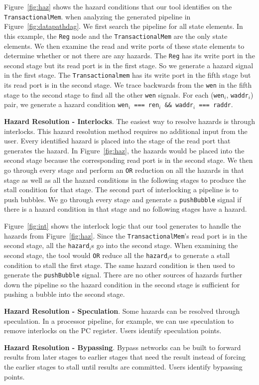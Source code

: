 Figure~\ref{fig:haz} shows the hazard conditions that our tool
identifies on the {\tt TransactionalMem}. when analyzing the generated pipeline in
Figure~\ref{fig:datapathdag}. We first search the pipeline for all
state elements. In this example, the {\tt Reg} node and the 
{\tt TransactionalMem} are the only state elements. We then examine
the read and write ports of these state elements to determine whether
or not there are any hazards. The {\tt Reg} has its write port in the
second stage but its read port is in the first stage. So we generate a
hazard signal in the first stage. The {\tt Transactionalmem} has its
write port in the fifth stage but its read port is in the second
stage. We trace backwards from the {\tt wen} in the fifth stage to the
second stage to find all the other {\tt wen} signals. For each 
({\tt wen}$_i$, {\tt waddr}$_i$) pair, we generate a hazard condition
{\tt wen$_i$ === ren$_i$ \&\& waddr$_i$ === raddr}.

{\bf Hazard Resolution - Interlocks}. The easiest way to resolve
hazards is through interlocks. This hazard resolution method requires
no additional input from the user. Every identified hazard is placed
into the stage of the read port that generates the hazard. In
Figure~\ref{fig:haz}, the hazards would be placed into the second
stage because the corresponding read port is in the second stage. We
then go through every stage and perform an {\tt OR} reduction on all
the hazards in that stage as well as all the hazard conditions in the
following stages to produce the stall condition for that stage. The
second part of interlocking a pipeline is to push bubbles. We go
through every stage and generate a {\tt pushBubble} signal if there is
a hazard condition in that stage and no following stages have a
hazard.

Figure~\ref{fig:int} shows the interlock logic that our tool
generates to handle the hazards from Figure~\ref{fig:haz}. Since
the {\tt TransactionalMem}'s read port is in the second stage, all the
{\tt hazard$_i$}s go into the second stage. When examining the second
stage, the tool would {\tt OR} reduce all the {\tt hazard}$_i$s to
generate a stall condition to stall the first stage. The same hazard
condition is then used to generate the {\tt pushBubble} signal. There
are no other sources of hazards further down the pipeline so the
hazard condition in the second stage is sufficient for pushing a
bubble into the second stage.

{\bf Hazard Resolution - Speculation}. Some hazards can be resolved
through speculation. In a processor pipeline, for example, we can use
speculation to remove interlocks on the PC register. Users identify
speculation points.

{\bf Hazard Resolution - Bypassing}. Bypass networks can be built to
forward results from later stages to earlier stages that need the
result instead of forcing the earlier stages to stall until results
are committed. Users identify bypassing points.
